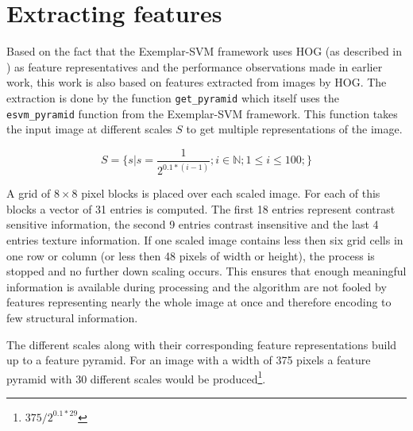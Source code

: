 \section{Extracting features}

Based on the fact that the Exemplar-SVM framework \cite{Malisiewicz2011} uses \ac{HOG} (as described in ) as feature representatives and the performance observations made in earlier work, this work is also based on features extracted from images by \ac{HOG}. The extraction is done by the function \verb|get_pyramid| which itself uses the \verb|esvm_pyramid| function from the Exemplar-SVM framework. This function takes the input image at different scales $S$ to get multiple representations of the image.

\begin{equation}
S = \{s|s = \frac{1}{2^{0.1 * (i-1)}}; i \in \mathbb{N}; 1 \le i \le 100;\}
\end{equation}

A grid of $8\times8$ pixel blocks is placed over each scaled image. For each of this blocks a vector of 31 entries is computed. The first 18 entries represent contrast sensitive information, the second 9 entries contrast insensitive and the last 4 entries texture information. If one scaled image contains less then six grid cells in one row or column (or less then 48 pixels of width or height), the process is stopped and no further down scaling occurs. This ensures that enough meaningful information is available during processing and the algorithm are not fooled by features representing nearly the whole image at once and therefore encoding to few structural information.
\par
The different scales along with their corresponding feature representations build up to a feature pyramid. For an image with a width of 375 pixels a feature pyramid with 30 different scales would be produced\footnote{$375/2^{0.1 * 29}$}. 

